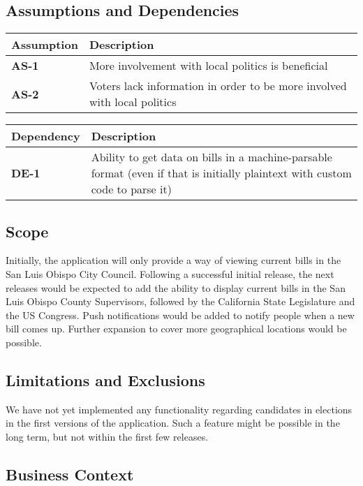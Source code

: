 \documentclass[12pt,oneside,letterpaper]{article}
\newcounter{functional_requirement}
\begin{document}
\subsection{Assumptions and Dependencies}
\begin{tabu}{lX}
  \toprule
  Assumption    & Description \\
  \midrule
  \textbf{AS-1} & More involvement with local politics is beneficial \\

  \textbf{AS-2} & Voters lack information in order to be more involved
  with local politics \\
  \bottomrule
\end{tabu}
\vspace{.3in}
\noindent\begin{tabu}{lX}
  \toprule
  Dependency    & Description \\
  \midrule
  \textbf{DE-1} &
  Ability to get data on bills in a machine-parsable format (even if
  that is initially plaintext with custom code to parse it) \\
  \bottomrule
\end{tabu}

\subsection{Scope}
Initially, the application will only provide a way of viewing current
bills in the San Luis Obispo City Council. Following a successful initial release, the next releases would be expected to add the ability to display current bills in the San Luis
Obispo County Supervisors, followed by the California State
Legislature and the US Congress. Push notifications would be added to
notify people when a new bill comes up. Further expansion to cover more geographical locations would be possible.

\subsection{Limitations and Exclusions}
We have not yet implemented any functionality regarding candidates in
elections in the first versions of the application. Such a feature
might be possible in the long term, but not within the first few
releases.

\subsection{Business Context}
\end{document}
